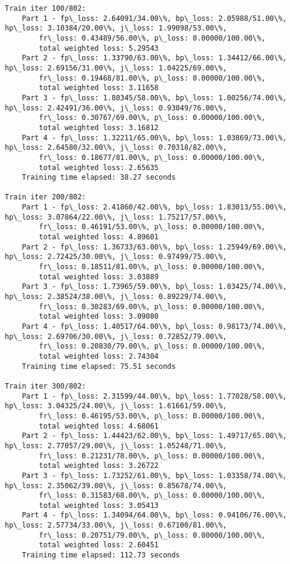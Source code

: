 \documentclass[11pt]{article}
\begin{document}
\begin{Verbatim}[commandchars=\\\{\}]
Train iter 100/802:
	Part 1 - fp\_loss: 2.64091/34.00\%, bp\_loss: 2.05988/51.00\%, hp\_loss: 3.10384/20.00\%, j\_loss: 1.99098/53.00\%, 
		fr\_loss: 0.43489/56.00\%, p\_loss: 0.00000/100.00\%, 
		total weighted loss: 5.29543
	Part 2 - fp\_loss: 1.33790/63.00\%, bp\_loss: 1.34412/66.00\%, hp\_loss: 2.69156/31.00\%, j\_loss: 1.04225/69.00\%, 
		fr\_loss: 0.19468/81.00\%, p\_loss: 0.00000/100.00\%, 
		total weighted loss: 3.11658
	Part 3 - fp\_loss: 1.80345/58.00\%, bp\_loss: 1.00256/74.00\%, hp\_loss: 2.42491/36.00\%, j\_loss: 0.93049/76.00\%, 
		fr\_loss: 0.30767/69.00\%, p\_loss: 0.00000/100.00\%, 
		total weighted loss: 3.16812
	Part 4 - fp\_loss: 1.32211/65.00\%, bp\_loss: 1.03869/73.00\%, hp\_loss: 2.64580/32.00\%, j\_loss: 0.70318/82.00\%, 
		fr\_loss: 0.18677/81.00\%, p\_loss: 0.00000/100.00\%, 
		total weighted loss: 2.65635
	Training time elapsed: 38.27 seconds

Train iter 200/802:
	Part 1 - fp\_loss: 2.41860/42.00\%, bp\_loss: 1.83013/55.00\%, hp\_loss: 3.07864/22.00\%, j\_loss: 1.75217/57.00\%, 
		fr\_loss: 0.46191/53.00\%, p\_loss: 0.00000/100.00\%, 
		total weighted loss: 4.89601
	Part 2 - fp\_loss: 1.36733/63.00\%, bp\_loss: 1.25949/69.00\%, hp\_loss: 2.72425/30.00\%, j\_loss: 0.97499/75.00\%, 
		fr\_loss: 0.18511/81.00\%, p\_loss: 0.00000/100.00\%, 
		total weighted loss: 3.03889
	Part 3 - fp\_loss: 1.73965/59.00\%, bp\_loss: 1.03425/74.00\%, hp\_loss: 2.38524/38.00\%, j\_loss: 0.89229/74.00\%, 
		fr\_loss: 0.30283/69.00\%, p\_loss: 0.00000/100.00\%, 
		total weighted loss: 3.09080
	Part 4 - fp\_loss: 1.40517/64.00\%, bp\_loss: 0.98173/74.00\%, hp\_loss: 2.69706/30.00\%, j\_loss: 0.72852/79.00\%, 
		fr\_loss: 0.20830/79.00\%, p\_loss: 0.00000/100.00\%, 
		total weighted loss: 2.74304
	Training time elapsed: 75.51 seconds

Train iter 300/802:
	Part 1 - fp\_loss: 2.31599/44.00\%, bp\_loss: 1.77028/58.00\%, hp\_loss: 3.04325/24.00\%, j\_loss: 1.61661/59.00\%, 
		fr\_loss: 0.46195/53.00\%, p\_loss: 0.00000/100.00\%, 
		total weighted loss: 4.68061
	Part 2 - fp\_loss: 1.44423/62.00\%, bp\_loss: 1.49717/65.00\%, hp\_loss: 2.77057/29.00\%, j\_loss: 1.05248/71.00\%, 
		fr\_loss: 0.21231/78.00\%, p\_loss: 0.00000/100.00\%, 
		total weighted loss: 3.26722
	Part 3 - fp\_loss: 1.73252/61.00\%, bp\_loss: 1.03358/74.00\%, hp\_loss: 2.35062/39.00\%, j\_loss: 0.85678/74.00\%, 
		fr\_loss: 0.31583/68.00\%, p\_loss: 0.00000/100.00\%, 
		total weighted loss: 3.05413
	Part 4 - fp\_loss: 1.34094/64.00\%, bp\_loss: 0.94106/76.00\%, hp\_loss: 2.57734/33.00\%, j\_loss: 0.67100/81.00\%, 
		fr\_loss: 0.20751/79.00\%, p\_loss: 0.00000/100.00\%, 
		total weighted loss: 2.60451
	Training time elapsed: 112.73 seconds


\end{Verbatim}
\end{document}
